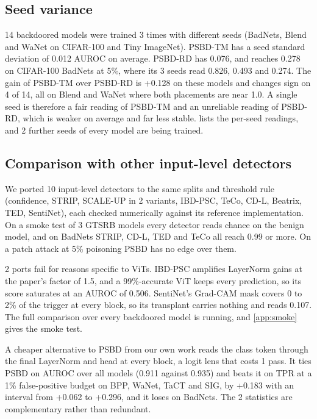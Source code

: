 \subsection{Seed variance}
\label{sec:robustness:seeds}

14 backdoored models were trained 3 times with different seeds (BadNets, Blend and WaNet on CIFAR-100 and Tiny ImageNet). PSBD-TM has a seed standard deviation of 0.012 AUROC on average. PSBD-RD has 0.076, and reaches 0.278 on CIFAR-100 BadNets at 5\%, where its 3 seeds read 0.826, 0.493 and 0.274. The gain of PSBD-TM over PSBD-RD is +0.128 on these models and changes sign on 4 of 14, all on Blend and WaNet where both placements are near 1.0. A single seed is therefore a fair reading of PSBD-TM and an unreliable reading of PSBD-RD, which is weaker on average and far less stable.  lists the per-seed readings, and 2 further seeds of every model are being trained.

\subsection{Comparison with other input-level detectors}
\label{sec:robustness:detectors}

We ported 10 input-level detectors to the same splits and threshold rule (confidence, STRIP, SCALE-UP in 2 variants, IBD-PSC, TeCo, CD-L, Beatrix, TED, SentiNet), each checked numerically against its reference implementation. On a smoke test of 3 GTSRB models every detector reads chance on the benign model, and on BadNets STRIP, CD-L, TED and TeCo all reach 0.99 or more. On a patch attack at 5\% poisoning PSBD has no edge over them.

2 ports fail for reasons specific to ViTs. IBD-PSC amplifies LayerNorm gains at the paper's factor of 1.5, and a 99\%-accurate ViT keeps every prediction, so its score saturates at an AUROC of 0.506. SentiNet's Grad-CAM \cite{selvaraju2017gradcam} mask covers 0 to 2\% of the trigger at every block, so its transplant carries nothing and reads 0.107. The full comparison over every backdoored model is running, and \cref{app:smoke} gives the smoke test.

A cheaper alternative to PSBD from our own work reads the class token through the final LayerNorm and head at every block, a logit lens \cite{nostalgebraist2020logitlens,belrose2023tunedlens} that costs 1 pass. It ties PSBD on AUROC over all models (0.911 against 0.935) and beats it on TPR at a 1\% false-positive budget on BPP, WaNet, TaCT and SIG, by +0.183 with an interval from +0.062 to +0.296, and it loses on BadNets. The 2 statistics are complementary rather than redundant.
